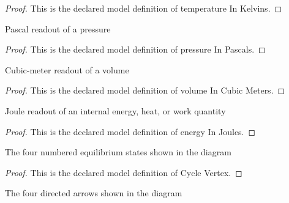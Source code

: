 \begin{proof}
  This is the declared model definition of temperature In Kelvins.
\end{proof}
\begin{definition}
  \label{def:physics:phyx-mini-0349:phyxminiproblems-problemphyxmini0349-pressureinpascals}
  Pascal readout of a pressure
\end{definition}
\begin{proof}
  This is the declared model definition of pressure In Pascals.
\end{proof}
\begin{definition}
  \label{def:physics:phyx-mini-0349:phyxminiproblems-problemphyxmini0349-volumeincubicmeters}
  Cubic-meter readout of a volume
\end{definition}
\begin{proof}
  This is the declared model definition of volume In Cubic Meters.
\end{proof}
\begin{definition}
  \label{def:physics:phyx-mini-0349:phyxminiproblems-problemphyxmini0349-energyinjoules}
  Joule readout of an internal energy, heat, or work quantity
\end{definition}
\begin{proof}
  This is the declared model definition of energy In Joules.
\end{proof}
\begin{definition}
  \label{def:physics:phyx-mini-0349:phyxminiproblems-problemphyxmini0349-cyclevertex}
  The four numbered equilibrium states shown in the diagram
\end{definition}
\begin{proof}
  This is the declared model definition of Cycle Vertex.
\end{proof}
\begin{definition}
  \label{def:physics:phyx-mini-0349:phyxminiproblems-problemphyxmini0349-cycleleg}
  The four directed arrows shown in the diagram
\end{definition}
